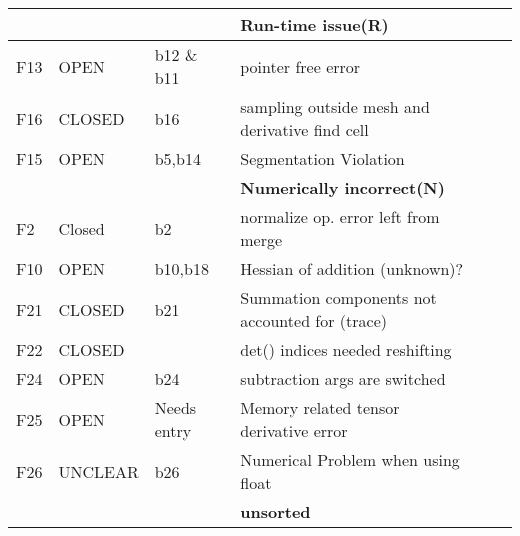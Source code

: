 \documentclass{article}
\begin{document}
\begin{tabular}{|l|ll|lll|}
   \hline
  \hline
 &&& \textbf{Run-time issue(R)}\\
 \hline
  F13 &OPEN & b12 \& b11  &pointer free error\\
    F16 &CLOSED & b16  & sampling outside mesh and derivative find cell  \\
   F15 &OPEN&b5,b14 &Segmentation Violation\\
  \hline
  \hline
 &&& \textbf{Numerically incorrect(N)}\\
 \hline 
  F2 &Closed &b2  & normalize op. error left from merge\\
  F10 &OPEN &b10,b18 &  Hessian of addition (unknown)?\\
   F21  &CLOSED&b21 &Summation components not accounted for (trace)\\
     F22  &CLOSED& & det() indices needed reshifting\\
     F24  &OPEN& b24& subtraction args are switched \\
     F25  &OPEN& Needs entry & Memory related tensor derivative error \\
     F26  &UNCLEAR& b26 & Numerical Problem when using float \\
  \hline
  \hline
 &&& \textbf{unsorted}\\
 \hline
\end{tabular}
\\





\end{document}
